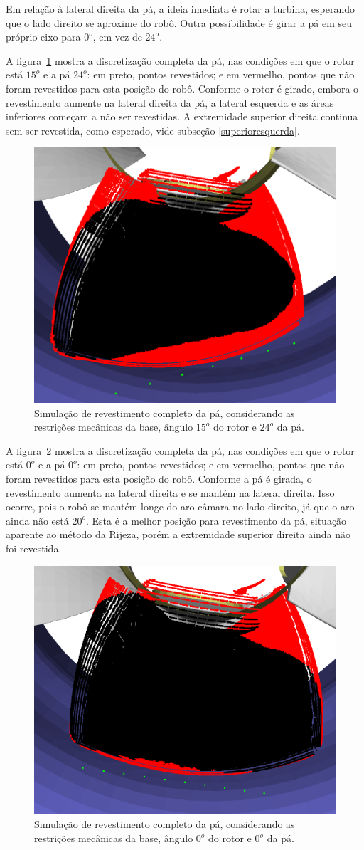 Em relação à lateral direita da pá, a ideia imediata é rotar a turbina,
esperando que o lado direito se aproxime do robô. Outra possibilidade é girar a
pá em seu próprio eixo para $0^o$, em vez de $24^o$. 

A figura~\ref{fig::simcomp1_2} mostra a discretização completa da pá, nas
condições em que o rotor está $15^o$ e a pá $24^o$: em preto, pontos
revestidos; e em vermelho, pontos que não foram revestidos para esta posição do
robô. Conforme o rotor é girado, embora o revestimento aumente na lateral
direita da pá, a lateral esquerda e as áreas inferiores começam a não ser
revestidas. A extremidade superior direita continua sem ser revestida, como
esperado, vide subseção \ref{superioresquerda}. 

\begin{figure}[!ht]
	\centering	
	\includegraphics[width=.5\columnwidth]{figs/simcomp1_2.png}
	\caption{Simulação de revestimento completo da pá, considerando as
	restrições mecânicas da base, ângulo $15^o$ do rotor e $24^o$ da pá.}
	\label{fig::simcomp1_2}
\end{figure}

A figura~\ref{fig::simcomp1_4} mostra a discretização completa da pá, nas
condições em que o rotor está $0^o$ e a pá $0^o$: em preto, pontos
revestidos; e em vermelho, pontos que não foram revestidos para esta posição do
robô. Conforme a pá é girada, o revestimento aumenta na lateral direita e se
mantém na lateral direita. Isso ocorre, pois o robô se mantém longe do aro
câmara no lado direito, já que o aro ainda não está $20^o$. Esta é a melhor
posição para revestimento da pá, situação aparente ao método da Rijeza, porém a
extremidade superior direita ainda não foi revestida.

\begin{figure}[!ht]
	\centering	
	\includegraphics[width=.5\columnwidth]{figs/simcomp1_4.png}
	\caption{Simulação de revestimento completo da pá, considerando as
	restrições mecânicas da base, ângulo $0^o$ do rotor e $0^o$ da pá.}
	\label{fig::simcomp1_4}
\end{figure}

